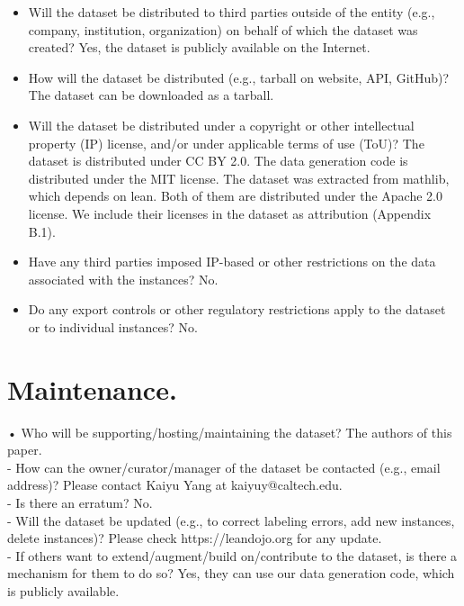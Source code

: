 \documentclass[
]{article}
\providecommand{\tightlist}{%
  \setlength{\itemsep}{0pt}\setlength{\parskip}{0pt}}
\begin{document}
\begin{itemize}
\tightlist
\item
  Will the dataset be distributed to third parties outside of the entity
  (e.g., company, institution, organization) on behalf of which the
  dataset was created? Yes, the dataset is publicly available on the
  Internet.\\
\item
  How will the dataset be distributed (e.g., tarball on website, API,
  GitHub)? The dataset can be downloaded as a tarball.\\
\item
  Will the dataset be distributed under a copyright or other
  intellectual property (IP) license, and/or under applicable terms of
  use (ToU)? The dataset is distributed under CC BY 2.0. The data
  generation code is distributed under the MIT license. The dataset was
  extracted from mathlib, which depends on lean. Both of them are
  distributed under the Apache 2.0 license. We include their licenses in
  the dataset as attribution (Appendix B.1).\\
\item
  Have any third parties imposed IP-based or other restrictions on the
  data associated with the instances? No.\\
\item
  Do any export controls or other regulatory restrictions apply to the
  dataset or to individual instances? No.
\end{itemize}

\section{Maintenance.}\label{maintenance.}

• Who will be supporting/hosting/maintaining the dataset? The authors of
this paper.\\
- How can the owner/curator/manager of the dataset be contacted (e.g.,
email address)? Please contact Kaiyu Yang at kaiyuy@caltech.edu.\\
- Is there an erratum? No.\\
- Will the dataset be updated (e.g., to correct labeling errors, add new
instances, delete instances)? Please check https://leandojo.org for any
update.\\
- If others want to extend/augment/build on/contribute to the dataset,
is there a mechanism for them to do so? Yes, they can use our data
generation code, which is publicly available.
\end{document}
